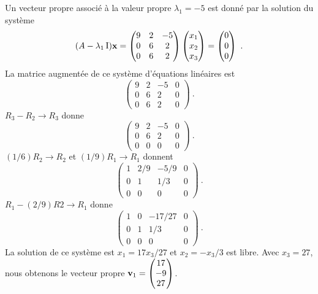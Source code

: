 { Un vecteur propre
associé à la valeur propre $\lambda_1 = -5$ est donné par la solution
du système
\[
(A-\lambda_1\operatorname{I})\mathbf{x} = 
\begin{pmatrix}
9 & 2 & -5 \\ 0 & 6 & 2 \\ 0 & 6 & 2
\end{pmatrix}
\begin{pmatrix} x_1 \\ x_2 \\ x_3 \end{pmatrix}
=
\begin{pmatrix} 0 \\ 0 \\ 0 \end{pmatrix} \ .
\]
La matrice augmentée de ce système d'équations linéaires est
\[
\left(\begin{array}{ccc|c}
9 & 2 & -5 & 0 \\ 0 & 6 & 2 & 0 \\ 0 & 6 & 2 & 0
\end{array}\right) \ .
\]
$R_3-R_2 \rightarrow R_3$ donne
\[
\left(\begin{array}{ccc|c}
9 & 2 & -5 & 0 \\ 0 & 6 & 2 & 0 \\ 0 & 0 & 0 & 0
\end{array}\right) \ .
\]
$(1/6)R_2 \rightarrow R_2$ et $(1/9)R_1 \rightarrow R_1$ donnent
\[
\left(\begin{array}{ccc|c}
1 & 2/9 & -5/9 & 0 \\ 0 & 1 & 1/3 & 0 \\ 0 & 0 & 0 & 0
\end{array}\right) \ .
\]
$R_1 - (2/9)R2 \rightarrow R_1$ donne
\[
\left(\begin{array}{ccc|c}
1 & 0 & -17/27 & 0 \\ 0 & 1 & 1/3 & 0 \\ 0 & 0 & 0 & 0
\end{array}\right) \ .
\]
La solution de ce système est $x_1=17x_3/27$ et $x_2=-x_3/3$ est
libre.  Avec $x_3=27$, nous obtenons le vecteur propre
$\displaystyle \mathbf{v}_1 = \begin{pmatrix} 17 \\ -9 \\ 27 \end{pmatrix} $.

}
